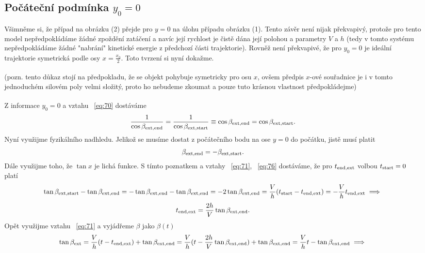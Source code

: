 \documentclass[reqno, a4paper]{amsart}
\begin{document}
\subsection*{Počáteční podmínka $y_0=0$}
Všimněme si, že případ na obrázku (2) přejde pro $y=0$ na úlohu případu obrázku (1). Tento závěr není nijak překvapivý, protože pro tento model nepředpokládáme žádné zpoždění zatáčení a navíc její rychlost je čistě dána její polohou a parametry $V$ a $h$ (tedy v tomto systému nepředpokládáme žádné "nabrání" kinetické energie z předchozí části trajektorie). Rovněž není překvapivé, že pro $y_0=0$ je ideální trajektorie symetrická podle osy $x=\frac{x_0}{2}$. Toto tvrzení si nyní dokažme.\\
\\
(pozn. tento důkaz stojí na předpokladu, že se objekt pohybuje symetricky pro osu $x$, ovšem předpis $x$-ové souřadnice je i v tomto jednoduchém silovém poly velmi složitý, proto ho nebudeme zkoumat a pouze tuto krásnou vlastnost předpokládejme)\\
\\
Z informace $y_0=0$ a vztahu ~\eqref{eq:70} dostáváme
\begin{equation}
	\label{eq:75}
	\frac{1}{\cos\beta_{\mathrm{ext}, \mathrm{end}}} = \frac{1}{\cos\beta_{\mathrm{ext}, \mathrm{start}}} \equiv  \cos\beta_{\mathrm{ext}, \mathrm{end}} = \cos\beta_{\mathrm{ext}, \mathrm{start}}.
\end{equation}
Nyní využijme fyzikálního nadhledu. Jelikož se musíme dostat z počátečního bodu na ose $y=0$ do počátku, jistě musí platit
\begin{equation}
	\label{eq:76}
	\beta_{\mathrm{ext}, \mathrm{end}}=-\beta_{\mathrm{ext}, \mathrm{start}}.
\end{equation}
Dále využijme toho, že $\tan x$ je lichá funkce. S tímto poznatkem a vztahy ~\eqref{eq:71}, ~\eqref{eq:76} dostáváme, že pro $t_{\mathrm{end}, \mathrm{ext}}$ volbou $t_{\mathrm{start}}=0$ platí
\begin{equation*}
	\tan \beta_{\mathrm{ext}, \mathrm{start}} -  \tan \beta_{\mathrm{ext}, \mathrm{end}} = -\tan \beta_{\mathrm{ext}, \mathrm{end}} -  \tan \beta_{\mathrm{ext}, \mathrm{end}}=-2\tan \beta_{\mathrm{ext}, \mathrm{end}}
	=\frac{V}{h} (t_{\mathrm{start}} - t_{\mathrm{end}, \mathrm{ext}})=-\frac{V}{h} t_{\mathrm{end}, \mathrm{ext}} \implies
\end{equation*}
\begin{equation}
	\label{eq:77}
	t_{\mathrm{end}, \mathrm{ext}}=\frac{2h}{V}\tan \beta_{\mathrm{ext}, \mathrm{end}}.
\end{equation}
Opět využijme vztahu ~\eqref{eq:71} a vyjádřeme $\beta$ jako $\beta (t)$
\begin{equation*}
	\tan \beta_{\mathrm{ext}} = \frac{V}{h}(t-t_{\mathrm{end}, \mathrm{ext}})+\tan \beta_{\mathrm{ext}, \mathrm{end}}=\frac{V}{h}(t-\frac{2h}{V}\tan \beta_{\mathrm{ext}, \mathrm{end}})+\tan \beta_{\mathrm{ext}, \mathrm{end}}=\frac{V}{h}t - \tan \beta_{\mathrm{ext}, \mathrm{end}} \implies
\end{equation*}
\end{document}
